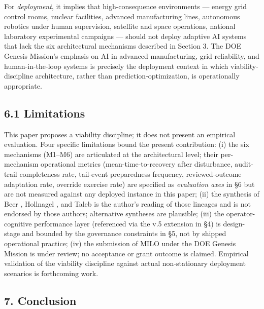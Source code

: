 For \emph{deployment}, it implies that high-consequence environments ---
energy grid control rooms, nuclear facilities, advanced manufacturing
lines, autonomous robotics under human supervision, satellite and space
operations, national laboratory experimental campaigns --- should not
deploy adaptive AI systems that lack the six architectural mechanisms
described in Section 3. The DOE Genesis Mission's emphasis on AI in
advanced manufacturing, grid reliability, and human-in-the-loop systems
\cite{ref5} is precisely the deployment context in which
viability-discipline architecture, rather than prediction-optimization,
is operationally appropriate.

\subsection{6.1 Limitations}\label{limitations}

This paper proposes a viability discipline; it does not present an
empirical evaluation. Four specific limitations bound the present
contribution: (i) the six mechanisms (M1--M6) are articulated at the
architectural level; their per-mechanism operational metrics
(mean-time-to-recovery after disturbance, audit-trail completeness rate,
tail-event preparedness frequency, reviewed-outcome adaptation rate,
override exercise rate) are specified as \emph{evaluation axes} in §6
but are not measured against any deployed instance in this paper; (ii)
the synthesis of Beer \cite{ref1}, Hollnagel \cite{ref2}, and Taleb \cite{ref3} is
the author's reading of those lineages and is not endorsed by those
authors; alternative syntheses are plausible; (iii) the
operator-cognitive performance layer (referenced via the v.5 extension
in §4) is design-stage and bounded by the governance constraints in §5,
not by shipped operational practice; (iv) the submission of MILO under
the DOE Genesis Mission \cite{ref5} is under review; no acceptance or grant
outcome is claimed. Empirical validation of the viability discipline
against actual non-stationary deployment scenarios is forthcoming work.

\subsection{7. Conclusion}\label{conclusion}

